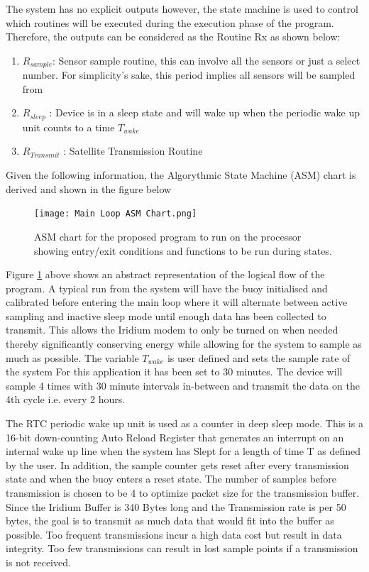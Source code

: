 The system has no explicit outputs however, the state machine is used to control which routines will be executed during the execution phase of the program. Therefore, the outputs can be considered as the Routine Rx as shown below:
\begin{enumerate}
	\item $R_{sample}$: Sensor sample routine, this can involve all the sensors or just a select number. For simplicity's sake, this period implies all sensors will be sampled from
	\item $R_{sleep}$ : Device is in a sleep state and will wake up when the periodic wake up unit counts to a time $T_{wake}$
	\item $R_{Transmit}$ : Satellite Transmission Routine
\end{enumerate}

Given the following information, the Algorythmic State Machine (ASM) chart is derived and shown in the figure below

\begin{figure}[H]
	\centering
	\texttt{[image: Main Loop ASM Chart.png]}
	\caption{ASM chart for the proposed program to run on the processor showing entry/exit conditions and functions to be run during states.}
	\label{fig:ASM_chart}
\end{figure}

Figure \ref{fig:ASM_chart} above shows an abstract representation of the logical flow of the program. A typical run from the system will have the buoy initialised and calibrated before entering the main loop where it will alternate between active sampling and inactive sleep mode until enough data has been collected to transmit. This allows the Iridium modem to only be turned on when needed thereby significantly conserving energy while allowing for the system to sample as much as possible. The variable $T_{wake}$ is user defined and sets the sample rate of the system For this application it has been set to 30 minutes. The device will sample 4 times with 30 minute intervals in-between and transmit the data on the 4th cycle i.e. every 2 hours.

The RTC periodic wake up unit is used as a counter in deep sleep mode. This is a 16-bit down-counting Auto Reload Register that generates an interrupt on an internal wake up line when the system has Slept for a length of time T as defined by the user. In addition, the sample counter gets reset after every transmission state and when the buoy enters a reset state. The number of samples before transmission is chosen to be 4 to optimize packet size for the transmission buffer. Since the Iridium Buffer is 340 Bytes long and the Transmission rate is per 50 bytes, the goal is to transmit as much data that would fit into the buffer as possible. Too frequent transmissions incur a high data cost but result in data integrity. Too few transmissions can result in lost sample points if a transmission is not received.


